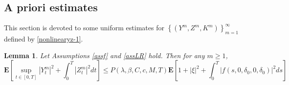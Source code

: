 \documentclass[10pt]{article}%
\numberwithin{equation}{section}
\newtheorem{lemma}[theorem]{Lemma}
\begin{document}
\subsection{A priori estimates}
This section is devoted to some uniform estimates for $\left\{\left(Y^m,Z^m,K^m\right)\right\}_{m=1}^{\infty}$ defined by \eqref{nonlinearyz-1}. 
\begin{lemma}\label{le-1}
Let Assumptions \ref{assf} and \ref{assLR} hold. Then for any $m\geq 1$,
\begin{equation*}
\mathbf{E}\left[\sup_{t\in[0,T]}\left|Y_{t}^{m}\right|^2+\int_{0}^{T}\left|Z_{t}^{m}\right|^2dt\right]\leq P(\lambda,\beta, C,c,M,T)\mathbf{E}\left[1+\left|\xi\right|^2+\int_{0}^{T}\left|f(s,0,\delta_0,0,\delta_0)\right|^2 ds\right]
\end{equation*}
\end{lemma}
\end{document}
